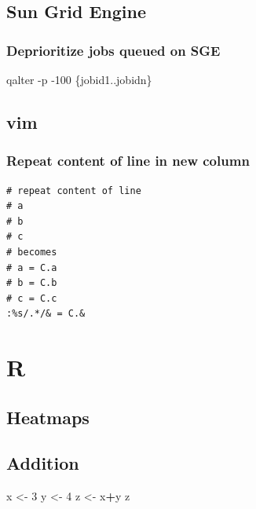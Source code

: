\documentclass[]{book}
\newenvironment{Shaded}{\begin{snugshade}}{\end{snugshade}}
\newcommand{\DataTypeTok}[1]{\textcolor[rgb]{0.13,0.29,0.53}{#1}}
\newcommand{\DecValTok}[1]{\textcolor[rgb]{0.00,0.00,0.81}{#1}}
\newcommand{\ExtensionTok}[1]{#1}
\newcommand{\NormalTok}[1]{#1}
\newcommand{\OperatorTok}[1]{\textcolor[rgb]{0.81,0.36,0.00}{\textbf{#1}}}
\newcommand{\StringTok}[1]{\textcolor[rgb]{0.31,0.60,0.02}{#1}}
\begin{document}
\hypertarget{sun-grid-engine}{%
\subsection{Sun Grid Engine}\label{sun-grid-engine}}

\hypertarget{deprioritize-jobs-queued-on-sge}{%
\subsubsection{Deprioritize jobs queued on SGE}\label{deprioritize-jobs-queued-on-sge}}

\begin{Shaded}
\begin{Highlighting}[]
\ExtensionTok{qalter}\NormalTok{ -p -100 }\DataTypeTok{\{jobid1..jobidn\}}
\end{Highlighting}
\end{Shaded}

\hypertarget{vim}{%
\subsection{vim}\label{vim}}

\hypertarget{repeat-content-of-line-in-new-column}{%
\subsubsection{Repeat content of line in new column}\label{repeat-content-of-line-in-new-column}}

\begin{verbatim}
# repeat content of line
# a
# b
# c
# becomes
# a = C.a
# b = C.b
# c = C.c
:%s/.*/& = C.&
\end{verbatim}

\hypertarget{r-1}{%
\section{R}\label{r-1}}

\hypertarget{heatmaps}{%
\subsection{Heatmaps}\label{heatmaps}}

\hypertarget{addition}{%
\subsection{Addition}\label{addition}}

\begin{Shaded}
\begin{Highlighting}[]
\NormalTok{x <-}\StringTok{ }\DecValTok{3}
\NormalTok{y <-}\StringTok{ }\DecValTok{4}
\NormalTok{z <-}\StringTok{ }\NormalTok{x}\OperatorTok{+}\NormalTok{y}
\NormalTok{z}
\end{Highlighting}
\end{Shaded}
\end{document}

